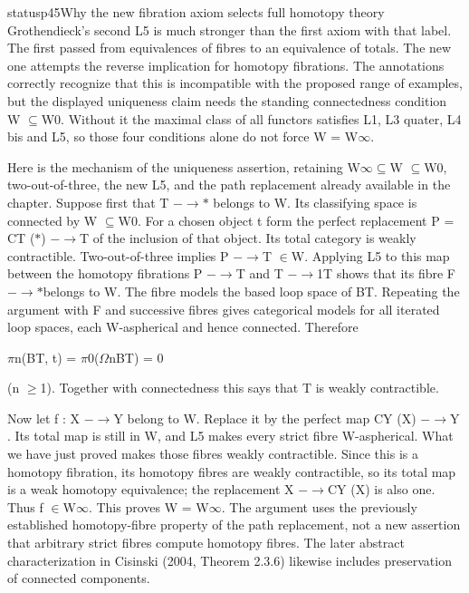 \begin{dcomment}{status}{p45}{Why the new fibration axiom selects full homotopy theory}
Grothendieck’s second L5 is much stronger than the first axiom with that label. The first passed from equivalences of fibres to an equivalence of totals. The new one attempts the reverse implication for homotopy fibrations. The annotations correctly recognize that this is incompatible with the proposed range of examples, but the displayed uniqueness claim needs the standing connectedness condition W \ensuremath{\subseteq}W0. Without it the maximal class of all functors satisfies L1, L3 quater, L4 bis and L5, so those four conditions alone do not force W = W\ensuremath{\infty}.

Here is the mechanism of the uniqueness assertion, retaining W\ensuremath{\infty}\ensuremath{\subseteq}W \ensuremath{\subseteq}W0, two-out-of-three, the new L5, and the path replacement already available in the chapter. Suppose first that T \ensuremath{-}\ensuremath{\to}\ensuremath{*} belongs to W. Its classifying space is connected by W \ensuremath{\subseteq}W0. For a chosen object t form the perfect replacement P = CT (\ensuremath{*}) \ensuremath{-}\ensuremath{\to}T of the inclusion of that object. Its total category is weakly contractible. Two-out-of-three implies P \ensuremath{-}\ensuremath{\to}T \ensuremath{\in}W. Applying L5 to this map between the homotopy fibrations P \ensuremath{-}\ensuremath{\to}T and T \ensuremath{-}\ensuremath{\to}1T shows that its fibre F \ensuremath{-}\ensuremath{\to}\ensuremath{*}belongs to W. The fibre models the based loop space of BT. Repeating the argument with F and successive fibres gives categorical models for all iterated loop spaces, each W-aspherical and hence connected. Therefore

\ensuremath{\pi}n(BT, t) = \ensuremath{\pi}0(\ensuremath{\Omega}nBT) = 0

(n \ensuremath{\geq}1). Together with connectedness this says that T is weakly contractible.

Now let f : X \ensuremath{-}\ensuremath{\to}Y belong to W. Replace it by the perfect map CY (X) \ensuremath{-}\ensuremath{\to}Y . Its total map is still in W, and L5 makes every strict fibre W-aspherical. What we have just proved makes those fibres weakly contractible. Since this is a homotopy fibration, its homotopy fibres are weakly contractible, so its total map is a weak homotopy equivalence; the replacement X \ensuremath{-}\ensuremath{\to}CY (X) is also one. Thus f \ensuremath{\in}W\ensuremath{\infty}. This proves W = W\ensuremath{\infty}. The argument uses the previously established homotopy-fibre property of the path replacement, not a new assertion that arbitrary strict fibres compute homotopy fibres. The later abstract characterization in Cisinski (2004, Theorem 2.3.6) likewise includes preservation of connected components.


\end{dcomment}
